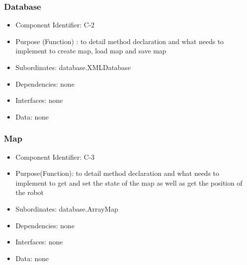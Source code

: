 \documentclass[11pt, a4paper]{report}
\begin{document}
\subsubsection{Database}
\begin{itemize}
\item Component Identifier: C-2
\item Purpose (Function) : to detail method declaration and
what needs to implement to create map, load map and save map
\item Subordinates: database.XMLDatabase
\item Dependencies: none
\item Interfaces: none
\item Data: none
\end{itemize}


\subsubsection{Map}
\begin{itemize}
\item Component Identifier:  C-3
\item Purpose(Function): to detail method declaration and what needs to implement
to get and set the state of the map as well as get the position of the robot
\item Subordinates: database.ArrayMap
\item Dependencies: none
\item Interfaces: none
\item Data: none
\end{itemize}
\end{document}
